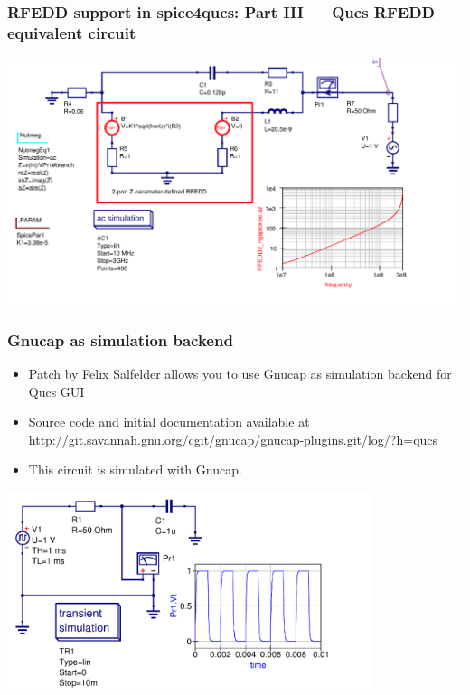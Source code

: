 \documentclass[9pt]{beamer}
\begin{document}
\begin{frame}
\frametitle{RFEDD support in spice4qucs: Part III --- Qucs RFEDD equivalent 
circuit}
\includegraphics[width=1.1\textwidth]{img/RFEDD2p.pdf}
\end{frame}

\begin{frame}
 \frametitle{Gnucap as simulation backend}
 \begin{itemize}
  \item Patch by Felix Salfelder allows you to use Gnucap as simulation backend 
for Qucs GUI
  \item Source code and initial documentation available at 
\url{http://git.savannah.gnu.org/cgit/gnucap/gnucap-plugins.git/log/?h=qucs}
  \item This circuit is simulated with Gnucap.
 \end{itemize}
 \includegraphics[width=0.8\textwidth]{img/gnucap.pdf}
 
\end{frame}
\end{document}
